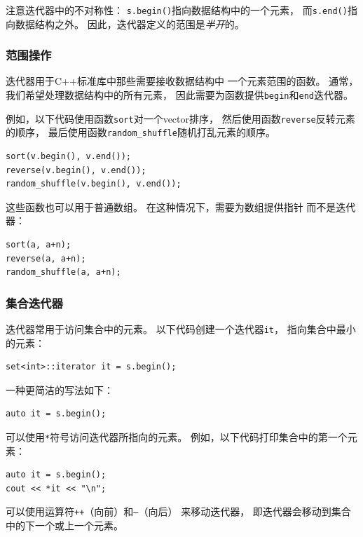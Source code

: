 注意迭代器中的不对称性：
\texttt{s.begin()}指向数据结构中的一个元素，
而\texttt{s.end()}指向数据结构之外。
因此，迭代器定义的范围是\emph{半开}的。

\subsubsection{范围操作}

迭代器用于C++标准库中那些需要接收数据结构中
一个元素范围的函数。
通常，我们希望处理数据结构中的所有元素，
因此需要为函数提供\texttt{begin}和\texttt{end}迭代器。

例如，以下代码使用函数\texttt{sort}对一个vector排序，
然后使用函数\texttt{reverse}反转元素的顺序，
最后使用函数\texttt{random\_shuffle}随机打乱元素的顺序。


\begin{lstlisting}
sort(v.begin(), v.end());
reverse(v.begin(), v.end());
random_shuffle(v.begin(), v.end());
\end{lstlisting}

这些函数也可以用于普通数组。
在这种情况下，需要为数组提供指针
而不是迭代器：

\newpage
\begin{lstlisting}
sort(a, a+n);
reverse(a, a+n);
random_shuffle(a, a+n);
\end{lstlisting}

\subsubsection{集合迭代器}

迭代器常用于访问集合中的元素。
以下代码创建一个迭代器\texttt{it}，
指向集合中最小的元素：
\begin{lstlisting}
set<int>::iterator it = s.begin();
\end{lstlisting}
一种更简洁的写法如下：
\begin{lstlisting}
auto it = s.begin();
\end{lstlisting}
可以使用\texttt{*}符号访问迭代器所指向的元素。
例如，以下代码打印集合中的第一个元素：

\begin{lstlisting}
auto it = s.begin();
cout << *it << "\n";
\end{lstlisting}

可以使用运算符\texttt{++}（向前）和\texttt{--}（向后）
来移动迭代器，
即迭代器会移动到集合中的下一个或上一个元素。

